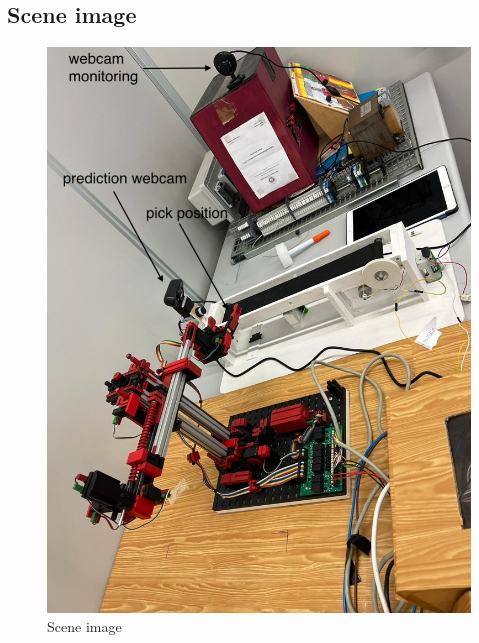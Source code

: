 \documentclass[a4paper,11pt]{report}
\theoremstyle{definition}
\theoremstyle{plain}
\begin{document}
        \subsection{Scene image}
            \begin{figure}[H]
                \centering
                \includegraphics[scale=0.5]{images/scene.jpeg}
                \caption{Scene image}
            \end{figure}
\end{document}
